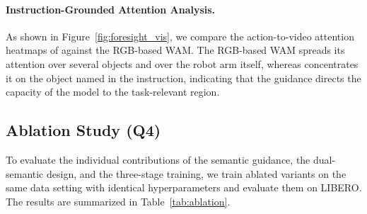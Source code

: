 \paragraph{Instruction-Grounded Attention Analysis.}
As shown in Figure~\ref{fig:foresight_vis}, we compare the action-to-video attention heatmaps of \ourmethod against the RGB-based WAM.
The RGB-based WAM spreads its attention over several objects and over the robot arm itself, whereas \ourmethod concentrates it on the object named in the instruction, indicating that the guidance directs the capacity of the model to the task-relevant region.

\subsection{Ablation Study (Q4)}
\label{sec:exp_ablation}

To evaluate the individual contributions of the semantic guidance, the dual-semantic design, and the three-stage training, we train ablated variants on the same data setting with identical hyperparameters and evaluate them on LIBERO.
The results are summarized in Table~\ref{tab:ablation}.

